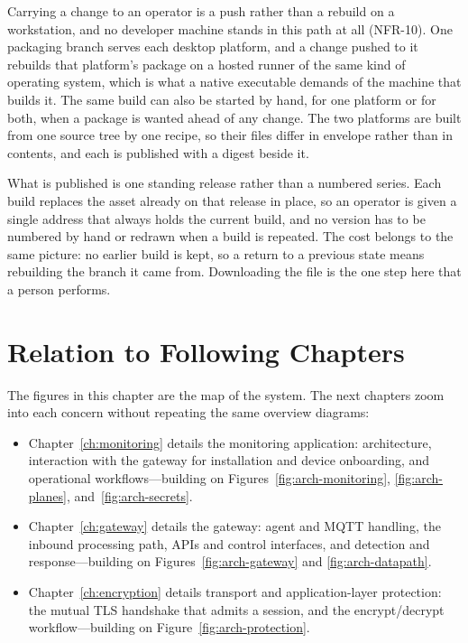 \documentclass[12pt,a4paper]{report}
\begin{document}
Carrying a change to an operator is a push rather than a rebuild on
a workstation, and no developer machine stands in this path at all
(NFR-10). One packaging branch serves each desktop platform, and a
change pushed to it rebuilds that platform's package on a hosted
runner of the same kind of operating system, which is what a native
executable demands of the machine that builds it. The same build can
also be started by hand, for one platform or for both, when a
package is wanted ahead of any change. The two platforms are built
from one source tree by one recipe, so their files differ in
envelope rather than in contents, and each is published with a
digest beside it.

What is published is one standing release rather than a numbered
series. Each build replaces the asset already on that release in
place, so an operator is given a single address that always holds
the current build, and no version has to be numbered by hand or
redrawn when a build is repeated. The cost belongs to the same
picture: no earlier build is kept, so a return to a previous state
means rebuilding the branch it came from. Downloading the file is
the one step here that a person performs.

\section{Relation to Following Chapters}
\label{sec:arch-roadmap}

The figures in this chapter are the map of the system.
The next chapters zoom into each concern without
repeating the same overview diagrams:

\begin{itemize}
    \item Chapter~\ref{ch:monitoring} details the
    monitoring application: architecture, interaction
    with the gateway for installation and device
    onboarding, and operational workflows---building on
    Figures~\ref{fig:arch-monitoring},
    \ref{fig:arch-planes}, and~\ref{fig:arch-secrets}.
    \item Chapter~\ref{ch:gateway} details the gateway:
    agent and MQTT handling, the inbound processing path,
    APIs and control interfaces, and detection and
    response---building on
    Figures~\ref{fig:arch-gateway} and
    \ref{fig:arch-datapath}.
    \item Chapter~\ref{ch:encryption} details transport
    and application-layer protection: the mutual TLS
    handshake that admits a session, and the
    encrypt/decrypt workflow---building on
    Figure~\ref{fig:arch-protection}.
\end{itemize}
\end{document}
